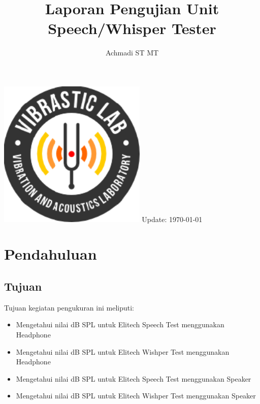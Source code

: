 \documentclass[12pt,]{article}
\title{\LARGE \bf
	Laporan Pengujian Unit Speech/Whisper Tester\\
}
\author{Achmadi ST MT}
\date{}
\begin{document}
	\thispagestyle{empty}
	\pagestyle{empty}

	\begin{titlepage}
		\centering
		\vfill
		\vfill
		\maketitle
		\vfill
		\includegraphics[width=200pt]{images/logo/logoviblab}
		\vfill
		\vfill
		Update: {\today} \currenttime \\
	\end{titlepage}


	\newpage
	\tableofcontents


	\newpage
	\section{Pendahuluan}

	\subsection{Tujuan}

	Tujuan kegiatan pengukuran ini meliputi:
	\begin{itemize}
		\item Mengetahui nilai dB SPL untuk Elitech Speech Test menggunakan Headphone
		\item Mengetahui nilai dB SPL untuk Elitech Wishper Test menggunakan Headphone
		\item Mengetahui nilai dB SPL untuk Elitech Speech Test menggunakan Speaker
		\item Mengetahui nilai dB SPL untuk Elitech Wishper Test menggunakan Speaker
	\end{itemize}
\end{document}
